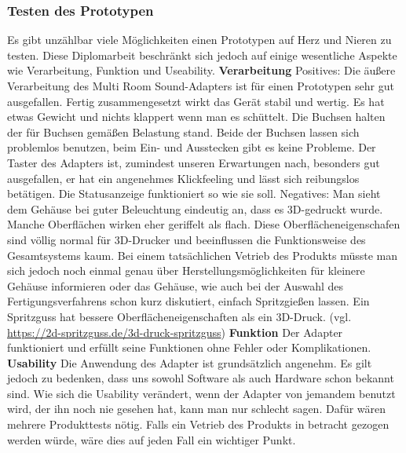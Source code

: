 \documentclass[11pt, twoside]{article}
\begin{document}
\subsubsection{Testen des Prototypen}
Es gibt unzählbar viele Möglichkeiten einen Prototypen auf Herz und Nieren zu testen. Diese Diplomarbeit beschränkt sich jedoch auf einige wesentliche Aspekte wie Verarbeitung, Funktion und Useability.
\vspace{4mm}\newline
\textbf{Verarbeitung}
\vspace{4mm}\newline
Positives:\newline
Die äußere Verarbeitung des Multi Room Sound-Adapters ist für einen Prototypen sehr gut ausgefallen. Fertig zusammengesetzt wirkt das Gerät stabil und wertig. Es hat etwas Gewicht und nichts klappert wenn man es schüttelt. Die Buchsen halten der für Buchsen gemäßen Belastung stand. Beide der Buchsen lassen sich problemlos benutzen, beim Ein- und Ausstecken gibt es keine Probleme. Der Taster des Adapters ist, zumindest unseren Erwartungen nach, besonders gut ausgefallen, er hat ein angenehmes Klickfeeling und lässt sich reibungslos betätigen. Die Statusanzeige funktioniert so wie sie soll.
\vspace{4mm}\newline
Negatives:\newline
Man sieht dem Gehäuse bei guter Beleuchtung eindeutig an, dass es 3D-gedruckt wurde. Manche Oberflächen wirken eher geriffelt als flach. Diese Oberflächeneigenschafen sind völlig normal für 3D-Drucker und beeinflussen die Funktionsweise des Gesamtsystems kaum. Bei einem tatsächlichen Vetrieb des Produkts müsste man sich jedoch noch einmal genau über Herstellungsmöglichkeiten für kleinere Gehäuse informieren oder das Gehäuse, wie auch bei der Auswahl des Fertigungsverfahrens schon kurz diskutiert, einfach Spritzgießen lassen. Ein Spritzguss hat bessere Oberflächeneigenschaften als ein 3D-Druck.
\vspace{4mm}\newline
(vgl. \url{https://2d-spritzguss.de/3d-druck-spritzguss})
\vspace{4mm}\newline
\textbf{Funktion}\newline
Der Adapter funktioniert und erfüllt seine Funktionen ohne Fehler oder Komplikationen.
\vspace{4mm}\newline
\textbf{Usability}\newline
Die Anwendung des Adapter ist grundsätzlich angenehm. Es gilt jedoch zu bedenken, dass uns sowohl Software als auch Hardware schon bekannt sind. Wie sich die Usability verändert, wenn der Adapter von jemandem benutzt wird, der ihn noch nie gesehen hat, kann man nur schlecht sagen. Dafür wären mehrere Produkttests nötig. Falls ein Vetrieb des Produkts in betracht gezogen werden würde, wäre dies auf jeden Fall ein wichtiger Punkt.\newline
\end{document}
